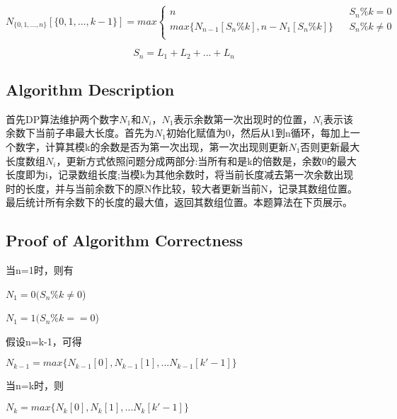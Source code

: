 \documentclass{article}
\begin{document}
\begin{CJK*}{UTF8}{gbsn}
\begin{equation} 
N_{\{0,1,...,n\}}[\{0,1,...,k-1\}]=max\left\{
\begin{array}{lcr}
n      &      &  S_n\%k=0\\
max\{N_{n-1}[S_n\%k], n-N_1[S_n\%k]\}    &      & S_n\%k\neq0\\

\end{array} \right.
\end{equation} 

\begin{equation} 
S_n = L_1+ L_2+...+L_n
\end{equation} 

\subsection{Algorithm Description}

首先DP算法维护两个数字$N_1$和$N_i$，$N_1$表示余数第一次出现时的位置，$N_i$表示该余数下当前子串最大长度。首先为$N_1$初始化赋值为0，然后从1到n循环，每加上一个数字，计算其模k的余数是否为第一次出现，第一次出现则更新$N_1$否则更新最大长度数组$N_i$，更新方式依照问题分成两部分:当所有和是k的倍数是，余数0的最大长度即为i，记录数组长度;当模k为其他余数时，将当前长度减去第一次余数出现时的长度，并与当前余数下的原N作比较，较大者更新当前N，记录其数组位置。最后统计所有余数下的长度的最大值，返回其数组位置。本题算法在下页展示。



\subsection{Proof of Algorithm Correctness}
当n=1时，则有
\\

\begin{center} 
$N_1=0 (S_n\%k \neq0$)

$N_1=1 (S_n\%k ==0$)
\end{center} 

假设n=k-1，可得

\begin{center} 
$N_{k-1}=max\{N_{k-1}[0], N_{k-1}[1],...N_{k-1}[k'-1]\}$
\end{center} 

当n=k时，则

\begin{center} 
$N_{k}=max\{N_{k}[0], N_{k}[1],...N_{k}[k'-1]\}$
\end{center} 


\end{CJK*}
\end{document}
